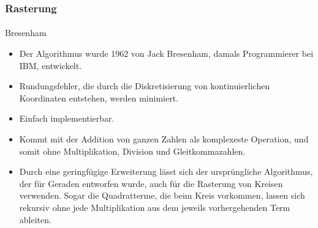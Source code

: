 \documentclass{beamer}
\begin{document}
\begin{frame}
    \frametitle{Rasterung}
\framesubtitle{}
\begin{block}{Bresenham}

\begin{itemize}
\item{Der Algorithmus wurde 1962 von Jack Bresenham, damals Programmierer bei IBM, entwickelt. }

\item{Rundungsfehler, die durch die Diskretisierung von kontinuierlichen Koordinaten entstehen, werden minimiert. }
\item{Einfach implementierbar.}

\item{Kommt mit der Addition von ganzen Zahlen als komplexeste Operation, und somit ohne Multiplikation, Division und Gleitkommazahlen. }

\item{Durch eine geringfügige Erweiterung lässt sich der ursprüngliche Algorithmus, der für Geraden entworfen wurde, auch für die Rasterung von Kreisen verwenden. Sogar die Quadratterme, die beim Kreis vorkommen, lassen sich rekursiv ohne jede Multiplikation aus dem jeweils vorhergehenden Term ableiten.}
\end{itemize}
\end{block}
\end{frame}
\end{document}
